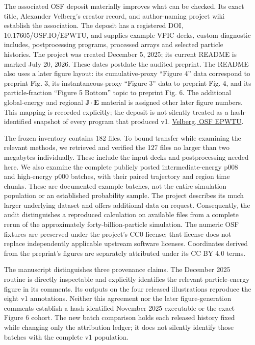 The associated OSF deposit materially improves what can be checked. Its
exact title, Alexander Velberg's creator record, and author-naming
project wiki establish the association. The deposit has a registered
DOI, 10.17605/OSF.IO/EPWTU, and supplies example VPIC decks, custom
diagnostic includes, postprocessing programs, processed arrays and
selected particle histories. The project was created December 5, 2025;
its current README is marked July 20, 2026. These dates postdate the
audited preprint. The README also uses a later figure layout: its
cumulative-proxy ``Figure 4'' data correspond to preprint Fig. 3, its
instantaneous-proxy ``Figure 3'' data to preprint Fig. 4, and its
particle-fraction ``Figure 5 Bottom'' topic to preprint Fig. 6. The
additional global-energy and regional \(\mathbf J\cdot\mathbf E\)
material is assigned other later figure numbers. This mapping is
recorded explicitly; the deposit is not silently treated as a
hash-identified snapshot of every program that produced v1.
\href{https://doi.org/10.17605/OSF.IO/EPWTU}{Velberg, OSF EPWTU}.

The frozen inventory contains 182 files. To bound transfer while
examining the relevant methods, we retrieved and verified the 127 files
no larger than two megabytes individually. These include the input decks
and postprocessing needed here. We also examine the complete publicly
posted intermediate-energy p008 and high-energy p000 batches, with their
paired trajectory and region time chunks. These are documented example
batches, not the entire simulation population or an established
probability sample. The project describes its much larger underlying
dataset and offers additional data on request. Consequently, the audit
distinguishes a reproduced calculation on available files from a
complete rerun of the approximately forty-billion-particle simulation.
The numeric OSF fixtures are preserved under the project's CC0 license;
that license does not replace independently applicable upstream software
licenses. Coordinates derived from the preprint's figures are separately
attributed under its CC BY 4.0 terms.

The manuscript distinguishes three provenance claims. The December 2025
routine is directly inspectable and explicitly identifies the relevant
particle-energy figure in its comments. Its outputs on the four released
illustrations reproduce the eight v1 annotations. Neither this agreement
nor the later figure-generation comments establish a hash-identified
November 2025 executable or the exact Figure 6 cohort. The new batch
comparison holds each released history fixed while changing only the
attribution ledger; it does not silently identify those batches with the
complete v1 population.

